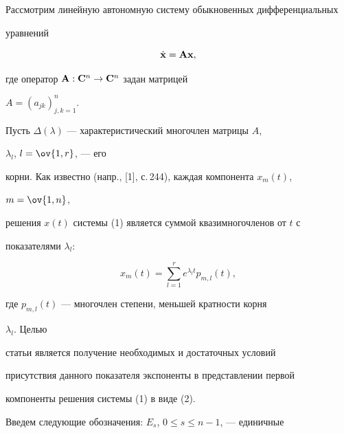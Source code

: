 

\maketitle 


\label{begin} 


 


 


Рассмотрим линейную автономную систему обыкновенных дифференциальных 


уравнений 


\begin{equation} 


\Dot{\bold x}=\bold{Ax}, 


\end{equation} 


где оператор $\bold A:\bold C^n\to \bold C^n$ задан матрицей 


$A=(a_{jk})^n_{j,k=1}$. 


 


Пусть $\Delta(\lambda)$ --- характеристический многочлен матрицы $A$, 


$\lambda_l$, $l=\ov{1,r}$, --- его 


корни. Как известно (напр., [1], с.\,244), каждая компонента $x_m(t)$, 


$m=\ov{1,n}$, 


решения $x(t)$ системы (1) является суммой квазимногочленов от $t$ с 


показателями $\lambda_l$: 


\begin{equation} 


x_m(t)=\sum^r_{l=1}e^{\lambda_l t}p_{m,l}(t), 


\end{equation} 


где $p_{m,l}(t)$ --- многочлен степени, меньшей кратности корня 


$\lambda_l$. Целью 


статьи является получение необходимых и достаточных условий 


присутствия данного показателя экспоненты в представлении первой 


компоненты решения системы (1) в виде (2). 


 


Введем следующие обозначения: $E_s$, $0\le s\le n-1$, --- единичные 


